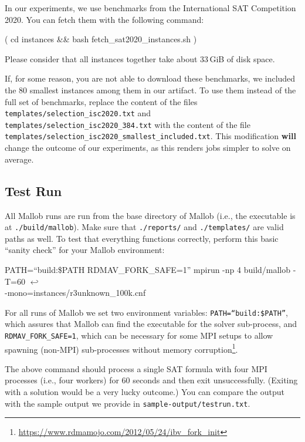 \documentclass[runningheads]{article}
\newcommand{\CR}{{\tiny$\hookleftarrow$}}
\numberwithin{dummy}{subsection}
\begin{document}
In our experiments, we use benchmarks from the International SAT Competition 2020.
You can fetch them with the following command:
\begin{ttfenv}
( cd instances \&\& bash fetch\_sat2020\_instances.sh )
\end{ttfenv}
Please consider that all instances together take about 33$\,$GiB of disk space.

If, for some reason, you are not able to download these benchmarks, we included the 80 smallest instances among them in our artifact.
To use them instead of the full set of benchmarks, replace the content of the files \texttt{templates/selection\_isc2020.txt} and \texttt{templates/selection\_isc2020\_384.txt} with the content of the file \texttt{templates/selection\_isc2020\_smallest\_included.txt}.
This modification \textbf{will} change the outcome of our experiments, as this renders jobs simpler to solve on average.

\subsection{Test Run}

All Mallob runs are run from the base directory of Mallob (i.e., the executable is at \texttt{./build/mallob}).
Make sure that \texttt{./reports/} and \texttt{./templates/} are valid paths as well.
To test that everything functions correctly, perform this basic ``sanity check'' for your Mallob environment:

\begin{ttfenv}
PATH=``build:\$PATH RDMAV\_FORK\_SAFE=1'' mpirun -np 4 build/mallob -T=60 \CR\\
\hspace*{0.3cm}-mono=instances/r3unknown\_100k.cnf
\end{ttfenv}

For all runs of Mallob we set two environment variables: \texttt{PATH=``build:\$PATH''}, which assures that Mallob can find the executable for the solver sub-process, and \texttt{RDMAV\_FORK\_SAFE=1}, which can be necessary for some MPI setups to allow spawning (non-MPI) sub-processes without memory corruption\footnote{\url{https://www.rdmamojo.com/2012/05/24/ibv_fork_init}}.

The above command should process a single SAT formula with four MPI processes (i.e., four workers) for 60 seconds and then exit unsuccessfully. (Exiting with a solution would be a very lucky outcome.)
You can compare the output with the sample output we provide in \texttt{sample-output/testrun.txt}.
\end{document}
